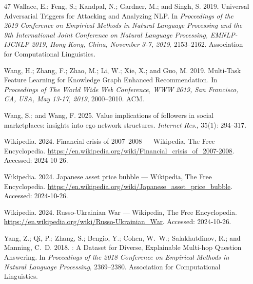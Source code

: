 \documentclass[letterpaper]{article} %
\begin{document}
\begin{thebibliography}{47}
    Wallace, E.; Feng, S.; Kandpal, N.; Gardner, M.; and Singh, S. 2019.
    \newblock Universal Adversarial Triggers for Attacking and Analyzing {NLP}.
    \newblock In \emph{Proceedings of the 2019 Conference on Empirical Methods in Natural Language Processing and the 9th International Joint Conference on Natural Language Processing, {EMNLP-IJCNLP} 2019, Hong Kong, China, November 3-7, 2019}, 2153--2162. Association for Computational Linguistics.
    
    Wang, H.; Zhang, F.; Zhao, M.; Li, W.; Xie, X.; and Guo, M. 2019.
    \newblock Multi-Task Feature Learning for Knowledge Graph Enhanced Recommendation.
    \newblock In \emph{Proceedings of The World Wide Web Conference, {WWW} 2019, San Francisco, CA, USA, May 13-17, 2019}, 2000--2010. {ACM}.
    
    Wang, S.; and Wang, F. 2025.
    \newblock Value implications of followers in social marketplaces: insights into ego network structures.
    \newblock \emph{Internet Res.}, 35(1): 294--317.
    
    {Wikipedia}. 2024{}.
    \newblock Financial crisis of 2007–2008 --- {Wikipedia}{,} The Free Encyclopedia.
    \newblock \url{https://en.wikipedia.org/wiki/Financial_crisis_of_2007-2008}.
    \newblock Accessed: 2024-10-26.
    
    {Wikipedia}. 2024{}.
    \newblock Japanese asset price bubble --- {Wikipedia}{,} The Free Encyclopedia.
    \newblock \url{https://en.wikipedia.org/wiki/Japanese_asset_price_bubble}.
    \newblock Accessed: 2024-10-26.
    
    {Wikipedia}. 2024{}.
    \newblock Russo-Ukrainian War --- {Wikipedia}{,} The Free Encyclopedia.
    \newblock \url{https://en.wikipedia.org/wiki/Russo-Ukrainian_War}.
    \newblock Accessed: 2024-10-26.
    
    Yang, Z.; Qi, P.; Zhang, S.; Bengio, Y.; Cohen, W.~W.; Salakhutdinov, R.; and Manning, C.~D. 2018.
    : A Dataset for Diverse, Explainable Multi-hop Question Answering.
    \newblock In \emph{Proceedings of the 2018 Conference on Empirical Methods in Natural Language Processing}, 2369--2380. Association for Computational Linguistics.
    

\end{thebibliography}
\end{document}
